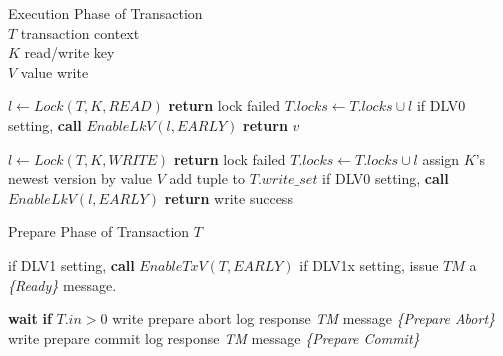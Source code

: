 \documentclass[conference]{IEEEtran}
\begin{document}
\begin{algorithm}[!h]

  \caption{Execution Phase of Transaction \\
  ${T}$ transaction context \\ 
  ${K}$ read/write key \\
  ${V}$ value write}

  \begin{algorithmic}[1]
    \State ${l \gets Lock(T, K, READ)}$
      \State \textbf{return} lock failed 
    \Else
      \State ${T.locks \gets T.locks \cup l}$
      \State if DLV0 setting, \textbf{call} $EnableLkV(l, EARLY)$
      \State \textbf{return} ${v}$
    \EndIf
  \EndFunction
  \label{func:read}
  \end{algorithmic}


  \begin{algorithmic}[1]
  \State ${l \gets Lock(T, K, WRITE)}$
    \State \textbf{return} lock failed
  \Else
    \State ${T.locks \gets T.locks \cup l}$
    \State assign ${K}$'s newest version by value ${V}$
    \State add tuple to ${T.write\_set}$
    \State if DLV0 setting, \textbf{call} $EnableLkV(l, EARLY)$
    \State \textbf{return} write success
  \EndIf
  \label{func:write}
  \EndFunction
  \end{algorithmic}
  \label{alg:execution_phase}
\end{algorithm}

\begin{algorithm}[!h]
  \caption{Prepare Phase of Transaction ${T}$}
  \begin{algorithmic}[1]
      \State if DLV1 setting, \textbf{call} ${EnableTxV(T, EARLY)}$
      \State if DLV1x setting, issue $TM$ a \emph{\{Ready\}} message.


    \State \textbf{wait} \textbf{if} ${T.in > 0}$
      \State write prepare abort log
      \State response \emph{TM} message \emph{\{Prepare Abort\}} 
      \State write prepare commit log
      \State response \emph{TM} message \emph{\{Prepare Commit\}} 
    \EndIf
  \EndFunction
  \end{algorithmic}
  \label{alg:prepare_phase}
\end{algorithm}
\end{document}
